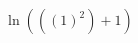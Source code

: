 \documentclass[preview]{standalone}
\begin{document}
\begin{align*}
\ln \left( \left( { \left(1\right) }^{2} \right) + 1 \right)
\end{align*}
\end{document}
